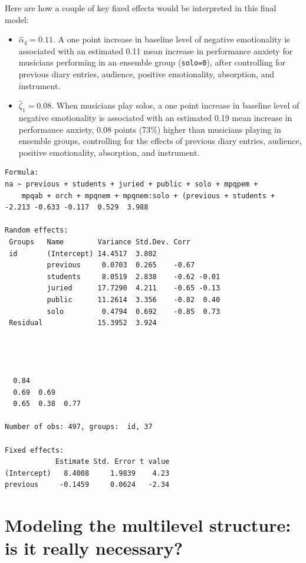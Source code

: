\documentclass[
]{krantz}
\providecommand{\tightlist}{%
  \setlength{\itemsep}{0pt}\setlength{\parskip}{0pt}}
\begin{document}
Here are how a couple of key fixed effects would be interpreted in this final model:

\begin{itemize}
\tightlist
\item
  \(\hat{\alpha}_{4} = 0.11\). A one point increase in baseline level of negative emotionality is associated with an estimated 0.11 mean increase in performance anxiety for musicians performing in an ensemble group (\texttt{solo=0}), after controlling for previous diary entries, audience, positive emotionality, absorption, and instrument.
\item
  \(\hat{\zeta}_{1} = 0.08\). When musicians play solos, a one point increase in baseline level of negative emotionality is associated with an estimated 0.19 mean increase in performance anxiety, 0.08 points (73\%) higher than musicians playing in ensemble groups, controlling for the effects of previous diary entries, audience, positive emotionality, absorption, and instrument.
\end{itemize}

\begin{verbatim}
Formula: 
na ~ previous + students + juried + public + solo + mpqpem +  
    mpqab + orch + mpqnem + mpqnem:solo + (previous + students +  
-2.213 -0.633 -0.117  0.529  3.988 

Random effects:
 Groups   Name        Variance Std.Dev. Corr       
 id       (Intercept) 14.4517  3.802               
          previous     0.0703  0.265    -0.67      
          students     8.0519  2.838    -0.62 -0.01
          juried      17.7290  4.211    -0.65 -0.13
          public      11.2614  3.356    -0.82  0.40
          solo         0.4794  0.692    -0.85  0.73
 Residual             15.3952  3.924               
                  
                  
                  
                  
  0.84            
  0.69  0.69      
  0.65  0.38  0.77
                  
Number of obs: 497, groups:  id, 37

Fixed effects:
            Estimate Std. Error t value
(Intercept)   8.4008     1.9839    4.23
previous     -0.1459     0.0624   -2.34
\end{verbatim}

\hypertarget{multinecessary}{%
\section{Modeling the multilevel structure: is it really necessary?}\label{multinecessary}}
\end{document}
